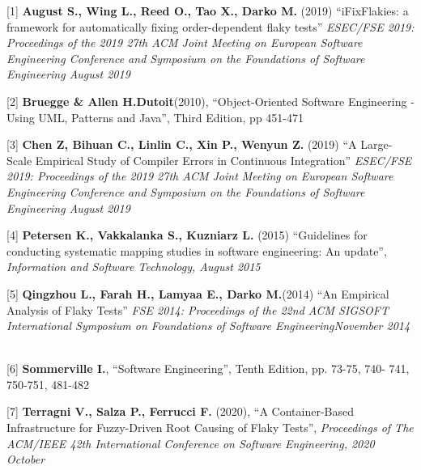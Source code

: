 \fancyhf{}
\fancyhead[C]{}
[1] \textbf{August S., Wing L., Reed O., Tao X., Darko M.} (2019) “iFixFlakies: a framework for automatically fixing order-dependent flaky tests” \emph{ESEC/FSE 2019: Proceedings of the 2019 27th ACM Joint Meeting on European Software Engineering Conference and Symposium on the Foundations of Software Engineering August 2019}
\newline

[2] \textbf{Bruegge \& Allen H.Dutoit}(2010), “Object-Oriented Software Engineering - Using UML, Patterns and Java”, Third Edition, pp 451-471
\newline

[3] \textbf{Chen Z, Bihuan C., Linlin C., Xin P., Wenyun Z.} (2019) “A Large-Scale Empirical Study of Compiler Errors in Continuous Integration” \emph{ESEC/FSE 2019: Proceedings of the 2019 27th ACM Joint Meeting on European Software Engineering Conference and Symposium on the Foundations of Software Engineering August 2019}
\newline

[4] \textbf{Petersen K., Vakkalanka S., Kuzniarz L.} (2015) “Guidelines for conducting systematic mapping studies in software engineering: An update”, \emph{Information and Software Technology, August 2015}
\newline

[5] \textbf{Qingzhou L., Farah H., Lamyaa E., Darko M.}(2014) “An Empirical Analysis of Flaky Tests” \emph{FSE 2014: Proceedings of the 22nd ACM SIGSOFT International Symposium on Foundations of Software EngineeringNovember 2014}
\newline~\newline

[6] \textbf{Sommerville I.}, “Software Engineering”, Tenth Edition, pp. 73-75, 740- 741, 750-751, 481-482
\newline

[7] \textbf{Terragni V., Salza P., Ferrucci F.} (2020), “A Container-Based Infrastructure for Fuzzy-Driven Root Causing of Flaky Tests”, \emph{Proceedings of The ACM/IEEE 42th International Conference on Software Engineering, 2020 October}